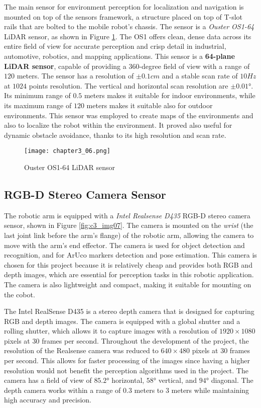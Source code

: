 The main sensor for environment perception for localization and navigation is mounted on top of the sensors
framework, a structure placed on top of T-slot rails that are bolted to the mobile robot's chassis.
The sensor is a \textit{Ouster OS1-64} LiDAR sensor, as shown in Figure \ref{fig:c3_img06}.
The OS1 offers clean, dense data across its entire field of view for accurate perception and crisp detail in industrial,
automotive, robotics, and mapping applications.
This sensor is a \textbf{64-plane LiDAR sensor}, capable of providing a 360-degree field of view with a range of $120$ meters. 
The sensor has a resolution of $\pm 0.1cm$ and a stable scan rate of $10 Hz$ at $1024$ points resolution.
The vertical and horizontal scan resolution are $\pm 0.01$°.
Its minimum range of $0.5$ meters makes it suitable for indoor environments, while its maximum range of $120$ meters
makes it suitable also for outdoor environments.
This sensor was employed to create maps of the environments and also to localize the robot within the environment.
It proved also useful for dynamic obstacle avoidance, thanks to its high resolution and scan rate.

\begin{figure}[t]
    \centering
    \texttt{[image: chapter3\_06.png]}
    \captionsetup{width=1\linewidth}
    \caption{Ouster OS1-64 LiDAR sensor}
    \label{fig:c3_img06}
\end{figure}

\subsection{RGB-D Stereo Camera Sensor}

The robotic arm is equipped with a \textit{Intel Realsense D435} RGB-D stereo camera sensor, shown in Figure \ref{fig:c3_img07}.
The camera is mounted on the \textit{wrist} (the last joint link before the arm's flange) of the robotic arm,
allowing the camera to move with the arm's end effector.
The camera is used for object detection and recognition, and for ArUco markers detection and pose estimation.
This camera is chosen for this project because it is relatively cheap and provides both RGB and depth images,
which are essential for perception tasks in this robotic application.
The camera is also lightweight and compact, making it suitable for mounting on the cobot.

The Intel RealSense D435 is a stereo depth camera that is designed for capturing RGB and depth images.
The camera is equipped with a global shutter and a rolling shutter, which allows it to capture images with a resolution
of $1920\times1080$ pixels at $30$ frames per second. Throughout the development of the project,
the resolution of the Realsense camera was reduced to $640\times480$ pixels at $30$ frames per second. 
This allows for faster processing of the images since having a higher resolution would not benefit the perception
algorithms used in the project.
The camera has a field of view of $85.2$° horizontal, $58$° vertical,
and $94$° diagonal. The depth camera works within a range of $0.3$ meters to $3$ meters while maintaining 
high accuracy and precision.

